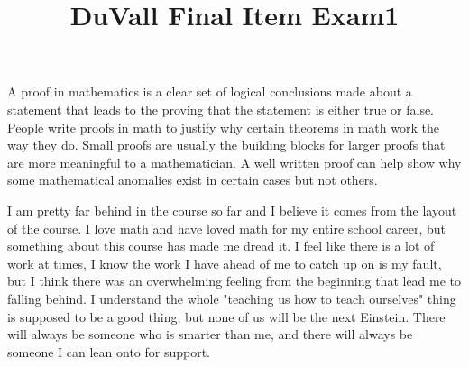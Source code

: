 \documentclass[12pt]{article}
\begin{document}
\title{DuVall Final Item Exam1}
\maketitle

A proof in mathematics is a clear set of logical conclusions made about a statement that leads to the proving that the statement is either true or false. People write proofs in math to justify why certain theorems in math work the way they do. Small proofs are usually the building blocks for larger proofs that are more meaningful to a mathematician. A well written proof can help show why some mathematical anomalies exist in certain cases but not others.

I am pretty far behind in the course so far and I believe it comes from the layout of the course. I love math and have loved math for my entire school career, but something about this course has made me dread it. I feel like there is a lot of work at times, I know the work I have ahead of me to catch up on is my fault, but I think there was an overwhelming feeling from the beginning that lead me to falling behind. I understand the whole "teaching us how to teach ourselves" thing is supposed to be a good thing, but none of us will be the next Einstein. There will always be someone who is smarter than me, and there will always be someone I can lean onto for support.
\end{document}
